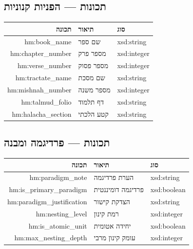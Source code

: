 \documentclass[12pt,a4paper]{article}
\newcommand{\new}[1]{\textcolor{newaddition}{#1}}
\newcommand{\newprop}[1]{\textcolor{newaddition}{#1}}
\begin{document}
\subsection{\new{תכונות   — הפניות קנוניות}}

\begin{longtable}{|r|p{5cm}|p{3cm}|}
\hline
\textbf{תכונה} & \textbf{תיאור} & \textbf{סוג} \\
\hline
\endhead

\newprop{hm:book\_name} & \new{שם ספר} & \new{xsd:string}\\
\hline
\newprop{hm:chapter\_number} & \new{מספר פרק} & \new{xsd:integer}\\
\hline
\newprop{hm:verse\_number} & \new{מספר פסוק} & \new{xsd:integer}\\
\hline
\newprop{hm:tractate\_name} & \new{שם מסכת} & \new{xsd:string}\\
\hline
\newprop{hm:mishnah\_number} & \new{מספר משנה} & \new{xsd:integer}\\
\hline
\newprop{hm:talmud\_folio} & \new{דף תלמוד} & \new{xsd:string}\\
\hline
\newprop{hm:halacha\_section} & \new{קטע הלכתי} & \new{xsd:string}\\
\hline
\end{longtable}

\subsection{\new{תכונות   — פרדיגמה ומבנה}}

\begin{longtable}{|r|p{5cm}|p{3cm}|}
\hline
\textbf{תכונה} & \textbf{תיאור} & \textbf{סוג} \\
\hline
\endhead

\newprop{hm:paradigm\_note} & \new{הערת פרדיגמה} & \new{xsd:string}\\
\hline
\newprop{hm:is\_primary\_paradigm} & \new{פרדיגמה דומיננטית} & \new{xsd:boolean}\\
\hline
\newprop{hm:paradigm\_justification} & \new{הצדקת קישור} & \new{xsd:string}\\
\hline
\newprop{hm:nesting\_level} & \new{רמת קינון} & \new{xsd:integer}\\
\hline
\newprop{hm:is\_atomic\_unit} & \new{יחידה אטומית} & \new{xsd:boolean}\\
\hline
\newprop{hm:max\_nesting\_depth} & \new{עומק קינון מרבי} & \new{xsd:integer}\\
\hline
\end{longtable}
\end{document}
